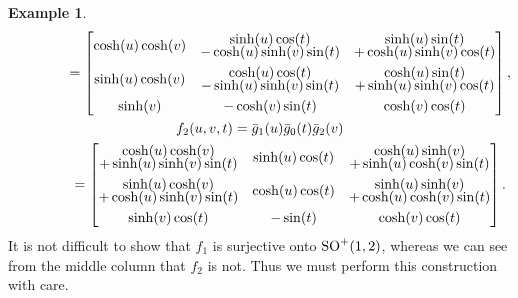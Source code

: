 \documentclass[pdftex]{sigma}
\numberwithin{equation}{section}
\theoremstyle{definition}
\newtheorem{exmpl}[teo]{Example}
\begin{document}
\begin{exmpl}
\begin{gather*}
\hphantom{f_1(u,v,t)}{}
=
\begin{bmatrix}
\cosh(u) \cosh(v) & \begin{array}{@{}c@{}} \sinh(u) \cos(t) \vspace{-1mm}\\ - \cosh(u) \sinh(v) \sin(t)\end{array}   &
\begin{array}{@{}c@{}} \sinh(u) \sin(t) \vspace{-1mm}\\ + \cosh(u) \sinh(v) \cos(t)\end{array}
\vspace{1mm}\\
\sinh(u) \cosh(v) & \begin{array}{@{}c@{}}\cosh(u) \cos(t)\vspace{-1mm}\\- \sinh(u) \sinh(v) \sin(t)\end{array} &
\begin{array}{@{}c@{}}\cosh(u) \sin(t)\vspace{-1mm}\\ + \sinh(u) \sinh(v) \cos(t)\end{array}
\vspace{1mm}\\
\sinh(v) & -\cosh(v) \sin(t) & \cosh(v) \cos(t)
\end{bmatrix},
\\
f_2(u,v,t)=\bar{g}_1(u) \bar{g}_0(t) \bar{g}_2(v)
\\
\hphantom{f_2(u,v,t)}{}
=
\begin{bmatrix}
\begin{array}{@{}c@{}} \cosh(u) \cosh(v)\vspace{-1mm}\\+ \sinh(u) \sinh(v) \sin(t)\end{array} & \sinh(u) \cos(t) &
 \begin{array}{@{}c@{}} \cosh(u) \sinh(v)\vspace{-1mm}\\+ \sinh(u) \cosh(v) \sin(t)\end{array}
\vspace{1mm}\\
\begin{array}{@{}c@{}} \sinh(u) \cosh(v)\vspace{-1mm}\\+ \cosh(u) \sinh(v) \sin(t)\end{array}
 & \cosh(u) \cos(t) & \begin{array}{@{}c@{}} \sinh(u) \sinh(v)\vspace{-1mm}\\+ \cosh(u) \cosh(v) \sin(t)\end{array}
\vspace{1mm}\\
\sinh(v) \cos(t) & -\sin(t) & \cosh(v) \cos(t)
\end{bmatrix}.
\end{gather*}
It is not dif\/f\/icult to show that $f_1$ is surjective onto ${\rm SO}^+(1,2)$, whereas we can see from the middle column
that $f_2$ is not.
Thus we must perform this construction with care.


\end{exmpl}
\end{document}
